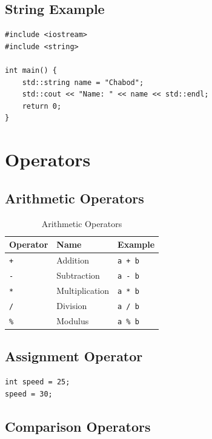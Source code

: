 \documentclass[10pt]{report}
\begin{document}
\subsection{String Example}

\begin{lstlisting}[caption={String Variable}]
#include <iostream>
#include <string>

int main() {
    std::string name = "Chabod";
    std::cout << "Name: " << name << std::endl;
    return 0;
}
\end{lstlisting}

\section{Operators}

\subsection{Arithmetic Operators}

\begin{table}[H]
\centering
\caption{Arithmetic Operators}
\begin{tabular}{lll}
\toprule
Operator & Name & Example \\
\midrule
\texttt{+} & Addition & \texttt{a + b} \\
\texttt{-} & Subtraction & \texttt{a - b} \\
\texttt{*} & Multiplication & \texttt{a * b} \\
\texttt{/} & Division & \texttt{a / b} \\
\texttt{\%} & Modulus & \texttt{a \% b} \\
\bottomrule
\end{tabular}
\end{table}

\subsection{Assignment Operator}

\begin{lstlisting}[caption={Assignment Example}]
int speed = 25;
speed = 30;
\end{lstlisting}

\subsection{Comparison Operators}
\end{document}
